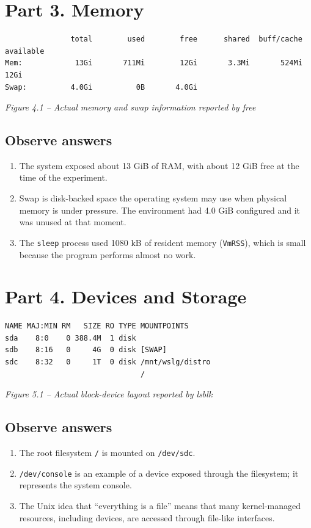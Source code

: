 \documentclass[12pt,a4paper]{article}
\newcommand{\figcap}[1]{\begin{center}\small\textit{#1}\end{center}\vspace{0.4em}}
\begin{document}
\section{Part 3. Memory}
\begin{lstlisting}
               total        used        free      shared  buff/cache   available
Mem:            13Gi       711Mi        12Gi       3.3Mi       524Mi        12Gi
Swap:          4.0Gi          0B       4.0Gi
\end{lstlisting}
\figcap{Figure 4.1 -- Actual memory and swap information reported by free}

\subsection{Observe answers}
\begin{enumerate}[label=\arabic*.]
\item The system exposed about 13 GiB of RAM, with about 12 GiB free at the time of the experiment.
\item Swap is disk-backed space the operating system may use when physical memory is under pressure. The environment had 4.0 GiB configured and it was unused at that moment.
\item The \texttt{sleep} process used 1080 kB of resident memory (\texttt{VmRSS}), which is small because the program performs almost no work.
\end{enumerate}

\section{Part 4. Devices and Storage}
\begin{lstlisting}
NAME MAJ:MIN RM   SIZE RO TYPE MOUNTPOINTS
sda    8:0    0 388.4M  1 disk
sdb    8:16   0     4G  0 disk [SWAP]
sdc    8:32   0     1T  0 disk /mnt/wslg/distro
                               /
\end{lstlisting}
\figcap{Figure 5.1 -- Actual block-device layout reported by lsblk}

\subsection{Observe answers}
\begin{enumerate}[label=\arabic*.]
\item The root filesystem \texttt{/} is mounted on \texttt{/dev/sdc}.
\item \texttt{/dev/console} is an example of a device exposed through the filesystem; it represents the system console.
\item The Unix idea that ``everything is a file'' means that many kernel-managed resources, including devices, are accessed through file-like interfaces.
\end{enumerate}
\end{document}
